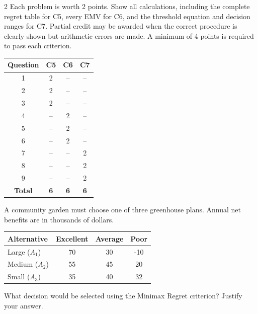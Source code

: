 
	\begin{multicols}{2}
		\raggedcolumns
		\vspace{-0.25cm}
		Each problem is worth 2 points. Show all calculations, including the complete regret table for C5, every EMV for C6, and the threshold equation and decision ranges for C7. Partial credit may be awarded when the correct procedure is clearly shown but arithmetic errors are made. A minimum of 4 points is required to pass each criterion.

		\begin{center}
			\begin{tabular}{|c|c|c|c|}
				\hline
				\textbf{Question} & \textbf{C5} & \textbf{C6} & \textbf{C7} \\ \hline
				1 & 2 & -- & -- \\ \hline
				2 & 2 & -- & -- \\ \hline
				3 & 2 & -- & -- \\ \hline
				4 & -- & 2 & -- \\ \hline
				5 & -- & 2 & -- \\ \hline
				6 & -- & 2 & -- \\ \hline
				7 & -- & -- & 2 \\ \hline
				8 & -- & -- & 2 \\ \hline
				9 & -- & -- & 2 \\ \hline
				\textbf{Total} & \textbf{6} & \textbf{6} & \textbf{6} \\ \hline
			\end{tabular}
		\end{center}

		\columnbreak

		A community garden must choose one of three greenhouse plans. Annual net benefits are in thousands of dollars.
		\begin{center}\small\setlength{\tabcolsep}{3pt}\renewcommand{\arraystretch}{1.15}
			\begin{tabular}{lccc}\toprule
			Alternative & Excellent & Average & Poor\\ \midrule
			Large ($A_1$)&70&30&-10\\
			Medium ($A_2$)&55&45&20\\
			Small ($A_3$)&35&40&32\\ \bottomrule
			\end{tabular}
		\end{center}\vspace{-3mm}
		What decision would be selected using the Minimax Regret criterion? Justify your answer.


\end{multicols}
